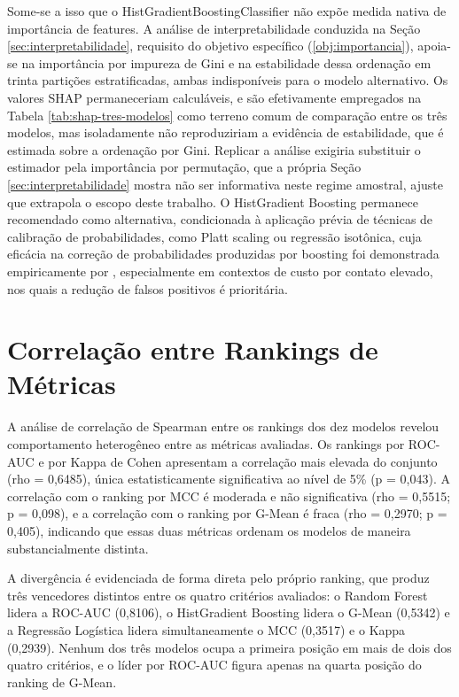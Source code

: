 Some-se a isso que o HistGradientBoostingClassifier não expõe medida nativa de importância de features. A análise de interpretabilidade conduzida na Seção \ref{sec:interpretabilidade}, requisito do objetivo específico (\ref{obj:importancia}), apoia-se na importância por impureza de Gini e na estabilidade dessa ordenação em trinta partições estratificadas, ambas indisponíveis para o modelo alternativo. Os valores SHAP permaneceriam calculáveis, e são efetivamente empregados na Tabela \ref{tab:shap-tres-modelos} como terreno comum de comparação entre os três modelos, mas isoladamente não reproduziriam a evidência de estabilidade, que é estimada sobre a ordenação por Gini. Replicar a análise exigiria substituir o estimador pela importância por permutação, que a própria Seção \ref{sec:interpretabilidade} mostra não ser informativa neste regime amostral, ajuste que extrapola o escopo deste trabalho. O HistGradient Boosting permanece recomendado como alternativa, condicionada à aplicação prévia de técnicas de calibração de probabilidades, como Platt scaling ou regressão isotônica, cuja eficácia na correção de probabilidades produzidas por boosting foi demonstrada empiricamente por , especialmente em contextos de custo por contato elevado, nos quais a redução de falsos positivos é prioritária.

\FloatBarrier
\section{Correlação entre Rankings de Métricas} \label{sec:correlacao-rankings}

A análise de correlação de Spearman entre os rankings dos dez modelos revelou comportamento heterogêneo entre as métricas avaliadas. Os rankings por ROC-AUC e por Kappa de Cohen apresentam a correlação mais elevada do conjunto (rho = 0,6485), única estatisticamente significativa ao nível de 5\% (p = 0,043). A correlação com o ranking por MCC é moderada e não significativa (rho = 0,5515; p = 0,098), e a correlação com o ranking por G-Mean é fraca (rho = 0,2970; p = 0,405), indicando que essas duas métricas ordenam os modelos de maneira substancialmente distinta.

A divergência é evidenciada de forma direta pelo próprio ranking, que produz três vencedores distintos entre os quatro critérios avaliados: o Random Forest lidera a ROC-AUC (0,8106), o HistGradient Boosting lidera o G-Mean (0,5342) e a Regressão Logística lidera simultaneamente o MCC (0,3517) e o Kappa (0,2939). Nenhum dos três modelos ocupa a primeira posição em mais de dois dos quatro critérios, e o líder por ROC-AUC figura apenas na quarta posição do ranking de G-Mean.

